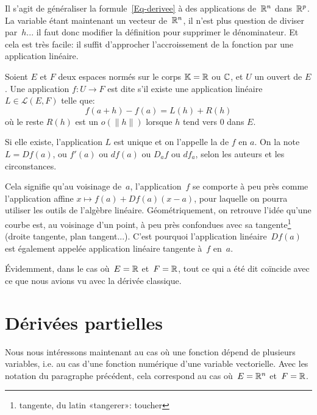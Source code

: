 Il s'agit de généraliser la formule~\ref{Eq-derivee} à des applications de~$\mathbb R^n$ dans~$\mathbb R^p$. La variable étant maintenant un vecteur de~$\mathbb R^n $, il n'est plus question de diviser par~$h$... il faut donc modifier la définition pour supprimer le dénominateur. Et cela est très facile: il suffit d'approcher l'accroissement de la fonction par une application linéaire.
\begin{definition}[Différentielle]
Soient $E$ et $F$ deux espaces normés sur le corps $\mathbb K=\mathbb R$ ou $\mathbb C$, et $U$ un ouvert de $E$. Une application $f: U\rightarrow F$ est dite  s'il existe une application linéaire $L\in\mathcal{L}(E,F)$ telle que:
\begin{equation}
f(a+h)-f(a)=L(h)+R(h)
\end{equation}
où le reste $R(h)$ est un $o(\|h\|)$ lorsque $h$ tend vers $0$ dans $E$.

\medskip
Si elle existe, l'application $L$ est unique et on l'appelle la  de $f$ en $a$.
On la note $L=Df(a)$, ou $f'(a)$ ou $df(a)$ ou $D_af$ ou $df_a$, selon les auteurs et les circonstances.
\end{definition}
Cela signifie qu'au voisinage de~$a$, l'application~$f$ se comporte à peu près comme l'application affine $x\mapsto f(a)+Df(a)(x-a)$, pour laquelle on pourra utiliser les outils de l'algèbre linéaire. Géométriquement, on retrouve l'idée qu'une courbe est, au voisinage d'un point, à peu près confondues avec sa tangente\footnote{tangente, du latin «tangerer»: toucher} (droite tangente, plan tangent...). C'est pourquoi l'application linéaire~$Df(a)$ est également appelée application linéaire tangente à~$f$ en~$a$.

\medskip
Évidemment, dans le cas où~$E=\mathbb R$ et~$F=\mathbb R$, tout ce qui a été dit coïncide avec ce que nous avions vu avec la dérivée classique.

\medskip
\section{Dérivées partielles}

Nous nous intéressons maintenant au cas où une fonction dépend de plusieurs variables, i.e. au cas d'une fonction numérique d'une variable vectorielle. Avec les notation du paragraphe précédent, cela correspond au cas où~$E=\mathbb R^n$ et~$F=\mathbb R$.

